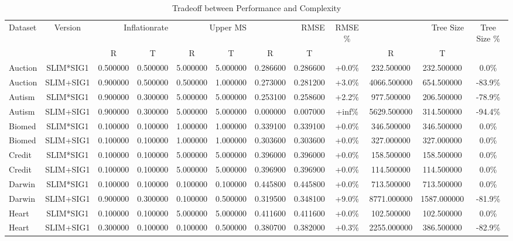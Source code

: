 
    \begin{table}[H]
        \centering
        \renewcommand{\arraystretch}{1.2}
        \caption{Tradeoff between Performance and Complexity}
        \label{tab:RQ_Inflationrate_tradeoff}
    \begin{tabular}{lccccccccccc}
\toprule
Dataset & Version & \multicolumn{2}{r}{Inflationrate} & \multicolumn{2}{r}{Upper MS} & \multicolumn{2}{r}{RMSE} & RMSE \% & \multicolumn{2}{r}{Tree Size} & Tree Size \% \\
 &  &  R &  T &  R &  T &  R &  T &  &  R &  T &  \\
\midrule
Auction & SLIM*SIG1 & 0.500000 & 0.500000 & 5.000000 & 5.000000 & 0.286600 & 0.286600 & +0.0\% & 232.500000 & 232.500000 & 0.0\% \\
Auction & SLIM+SIG1 & 0.900000 & 0.500000 & 0.500000 & 1.000000 & 0.273000 & 0.281200 & +3.0\% & 4066.500000 & 654.500000 & -83.9\% \\
Autism & SLIM*SIG1 & 0.900000 & 0.300000 & 5.000000 & 5.000000 & 0.253100 & 0.258600 & +2.2\% & 977.500000 & 206.500000 & -78.9\% \\
Autism & SLIM+SIG1 & 0.900000 & 0.300000 & 5.000000 & 5.000000 & 0.000000 & 0.007000 & +inf\% & 5629.500000 & 314.500000 & -94.4\% \\
Biomed & SLIM*SIG1 & 0.100000 & 0.100000 & 1.000000 & 1.000000 & 0.339100 & 0.339100 & +0.0\% & 346.500000 & 346.500000 & 0.0\% \\
Biomed & SLIM+SIG1 & 0.100000 & 0.100000 & 1.000000 & 1.000000 & 0.303600 & 0.303600 & +0.0\% & 327.000000 & 327.000000 & 0.0\% \\
Credit & SLIM*SIG1 & 0.100000 & 0.100000 & 5.000000 & 5.000000 & 0.396000 & 0.396000 & +0.0\% & 158.500000 & 158.500000 & 0.0\% \\
Credit & SLIM+SIG1 & 0.100000 & 0.100000 & 5.000000 & 5.000000 & 0.396900 & 0.396900 & +0.0\% & 114.500000 & 114.500000 & 0.0\% \\
Darwin & SLIM*SIG1 & 0.100000 & 0.100000 & 0.100000 & 0.100000 & 0.445800 & 0.445800 & +0.0\% & 713.500000 & 713.500000 & 0.0\% \\
Darwin & SLIM+SIG1 & 0.900000 & 0.300000 & 0.100000 & 0.500000 & 0.319500 & 0.348100 & +9.0\% & 8771.000000 & 1587.000000 & -81.9\% \\
Heart & SLIM*SIG1 & 0.100000 & 0.100000 & 5.000000 & 5.000000 & 0.411600 & 0.411600 & +0.0\% & 102.500000 & 102.500000 & 0.0\% \\
Heart & SLIM+SIG1 & 0.300000 & 0.100000 & 0.100000 & 0.500000 & 0.380700 & 0.382000 & +0.3\% & 2255.000000 & 386.500000 & -82.9\% \\

\end{tabular}
\end{table}
